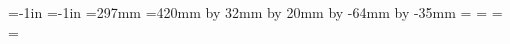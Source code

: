 =-1in    %
=-1in    %
=297mm   %
=420mm   %
\advance{} by 32mm     %
\advance{} by 20mm     %
\advance{} by -64mm    %
\advance{} by -35mm    %
\hoffset=            %
\voffset=            %
\hsize=              %
\vsize=              %

\parindent=0pt      %
\parskip=0pt      %

